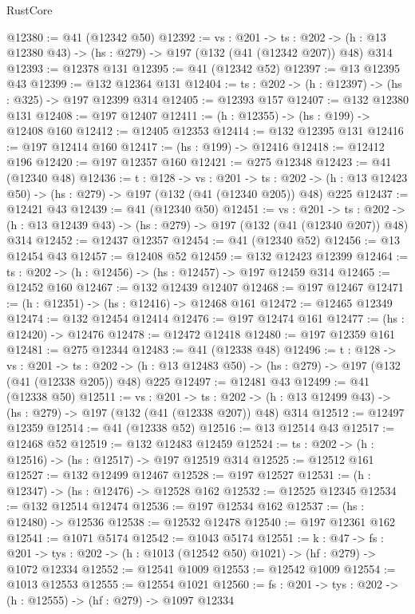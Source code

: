 \begin{lexlean}{RustCore}
\begin{coremodule}
@12380 := @41 (@12342 @50)
@12392 := {vs : @201} ->
  {ts : @202} -> (h : @13 @12380 @43) -> (hs : @279) -> @197 (@132 (@41 (@12342 @207)) @48) @314
@12393 := @12378 @131
@12395 := @41 (@12342 @52)
@12397 := @13 @12395 @43
@12399 := @132 @12364 @131
@12404 := {ts : @202} -> (h : @12397) -> (hs : @325) -> @197 @12399 @314
@12405 := @12393 @157
@12407 := @132 @12380 @131
@12408 := @197 @12407
@12411 := (h : @12355) -> (hs : @199) -> @12408 @160
@12412 := @12405 @12353
@12414 := @132 @12395 @131
@12416 := @197 @12414 @160
@12417 := (hs : @199) -> @12416
@12418 := @12412 @196
@12420 := @197 @12357 @160
@12421 := @275 @12348
@12423 := @41 (@12340 @48)
@12436 := {t : @128} ->
  {vs : @201} ->
  {ts : @202} -> (h : @13 @12423 @50) -> (hs : @279) -> @197 (@132 (@41 (@12340 @205)) @48) @225
@12437 := @12421 @43
@12439 := @41 (@12340 @50)
@12451 := {vs : @201} ->
  {ts : @202} -> (h : @13 @12439 @43) -> (hs : @279) -> @197 (@132 (@41 (@12340 @207)) @48) @314
@12452 := @12437 @12357
@12454 := @41 (@12340 @52)
@12456 := @13 @12454 @43
@12457 := @12408 @52
@12459 := @132 @12423 @12399
@12464 := {ts : @202} -> (h : @12456) -> (hs : @12457) -> @197 @12459 @314
@12465 := @12452 @160
@12467 := @132 @12439 @12407
@12468 := @197 @12467
@12471 := (h : @12351) -> (hs : @12416) -> @12468 @161
@12472 := @12465 @12349
@12474 := @132 @12454 @12414
@12476 := @197 @12474 @161
@12477 := (hs : @12420) -> @12476
@12478 := @12472 @12418
@12480 := @197 @12359 @161
@12481 := @275 @12344
@12483 := @41 (@12338 @48)
@12496 := {t : @128} ->
  {vs : @201} ->
  {ts : @202} -> (h : @13 @12483 @50) -> (hs : @279) -> @197 (@132 (@41 (@12338 @205)) @48) @225
@12497 := @12481 @43
@12499 := @41 (@12338 @50)
@12511 := {vs : @201} ->
  {ts : @202} -> (h : @13 @12499 @43) -> (hs : @279) -> @197 (@132 (@41 (@12338 @207)) @48) @314
@12512 := @12497 @12359
@12514 := @41 (@12338 @52)
@12516 := @13 @12514 @43
@12517 := @12468 @52
@12519 := @132 @12483 @12459
@12524 := {ts : @202} -> (h : @12516) -> (hs : @12517) -> @197 @12519 @314
@12525 := @12512 @161
@12527 := @132 @12499 @12467
@12528 := @197 @12527
@12531 := (h : @12347) -> (hs : @12476) -> @12528 @162
@12532 := @12525 @12345
@12534 := @132 @12514 @12474
@12536 := @197 @12534 @162
@12537 := (hs : @12480) -> @12536
@12538 := @12532 @12478
@12540 := @197 @12361 @162
@12541 := @1071 @5174
@12542 := @1043 @5174
@12551 := {k : @47} ->
  {fs : @201} -> {tys : @202} -> (h : @1013 (@12542 @50) @1021) -> (hf : @279) -> @1072 @12334
@12552 := @12541 @1009
@12553 := @12542 @1009
@12554 := @1013 @12553
@12555 := @12554 @1021
@12560 := {fs : @201} -> {tys : @202} -> (h : @12555) -> (hf : @279) -> @1097 @12334

\end{coremodule}
\end{lexlean}
